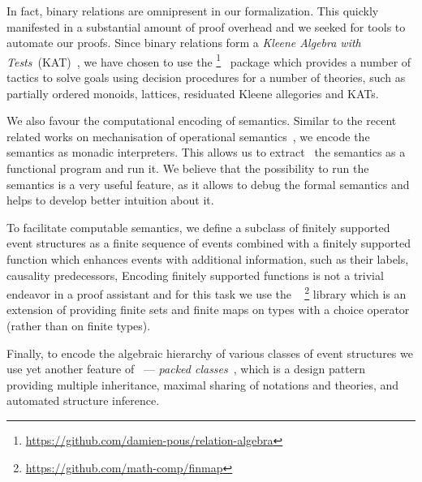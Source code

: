 In fact, binary relations are omnipresent in our formalization.
This quickly manifested in a substantial amount of proof overhead and
we seeked for tools to automate our proofs.
Since binary relations form a \emph{Kleene Algebra with Tests}~(KAT)~\cite{Kozen:TOPLAS:1997},
we have chosen to use the \relationalgebra%
\footnote{\url{https://github.com/damien-pous/relation-algebra}}~%
\cite{Pous-ITP2013} package 
which provides a number of tactics to solve goals using
decision procedures for a number of theories, such as
partially ordered monoids, lattices, residuated Kleene allegories and KATs.

We also favour the computational encoding of semantics. 
Similar to the recent related works on mechanisation 
of operational semantics~\cite{Xia-al:POPL2019, Letan-al:CPP2020, Affeldt-al:ICMPC2019}, 
we encode the semantics as monadic interpreters.  
This allows us to extract~\cite{Letouzey:CCE2008} 
the semantics as a functional program and run it. 
We believe that the possibility to run the semantics 
is a very useful feature, as it allows 
to debug the formal semantics
and helps to develop better intuition about it.

To facilitate computable semantics, we define a subclass of
finitely supported event structures as a finite sequence of events
combined with a finitely supported function which enhances events with 
additional information, such as their labels, causality predecessors, \etc 
Encoding finitely supported functions is not a trivial endeavor in
a proof assistant and for this task we use the \finmap~%
\footnote{\url{https://github.com/math-comp/finmap}}
library which is an extension of \mathcomp providing finite sets and
finite maps on types with a choice operator (rather than on finite types).

Finally, to encode the algebraic hierarchy of various classes of event structures
we use yet another feature of \mathcomp~--- 
\emph{packed classes}~\cite{Garillot-al:ICTPHOL2009},
which is a design pattern providing multiple inheritance,
maximal sharing of notations and theories,
and automated structure inference. %

